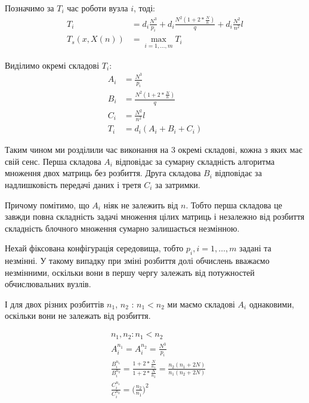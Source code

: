 Позначимо за $T_i$ час роботи вузла $i$, тоді:
\begin{equation}
	\begin{aligned} 
		T_i &= d_i \frac{N^3}{p_i} + d_i \frac{N^2 ( 1 + 2*\frac{N}{n} )}{q} + d_i \frac{N^2}{n^2} l \\
		T_s(x,X(n)) &= \max\limits_{i=1,\ldots,m} T_i
	\end{aligned} 
\end{equation}

Виділимо окремі складові $T_i$:
\begin{equation}
	\begin{aligned} 
		A_i &= \frac{N^3}{p_i} \\
		B_i &= \frac{N^2 ( 1 + 2*\frac{N}{n} )}{q} \\
		C_i &= \frac{N^2}{n^2} l \\
		T_i &= d_i ( A_i + B_i + C_i )
	\end{aligned} 
	\label{eq:T_i_parts}
\end{equation}

Таким чином ми розділили час виконання на 3 окремі складові, кожна з яких має свій сенс. Перша складова $A_i$ відповідає за сумарну складність алгоритма множення двох матриць без розбиття. Друга складова $B_i$ відповідає за надлишковість передачі даних і третя $C_i$ за затримки.

Причому помітимо, що $A_i$ ніяк не залежить від $n$. Тобто перша складова це завжди повна складність задачі множення цілих матриць і незалежно від розбиття складність блочного множення сумарно залишається незмінною.

Нехай фіксована конфігурація середовища, тобто $p_i, i=1,\ldots,m$ задані та незмінні. У такому випадку при зміні розбиття долі обчислень вважаємо незмінними, оскільки вони в першу чергу залежать від потужностей обчислювальних вузлів.

І для двох різних розбиттів $n_1$, $n_2$ : $n_1 < n_2$ ми маємо складові $A_i$ однаковими, оскільки вони не залежать від розбиття.

\begin{equation}
	\label{eq:diff_n1n2}
	\begin{aligned}
		& n_1, n_2 : n_1 < n_2
		\\
		&A_i^{n_1} = A_i^{n_2} = \frac{N^3}{p_i}
		\\
		&\frac{B_i^{n_1}}{B_i^{n_2}} = \frac{1 + 2*\frac{N}{n_1}}{1 + 2*\frac{N}{n_2}} =\frac{ n_2 ( n_1 + 2N ) }{n_1 ( n_2 + 2N )}
		\\
		&\frac{C_i^{n_1}}{C_i^{n_2}} = \bigg( \frac{n_2}{n_1} \bigg)^2
	\end{aligned}
\end{equation}

